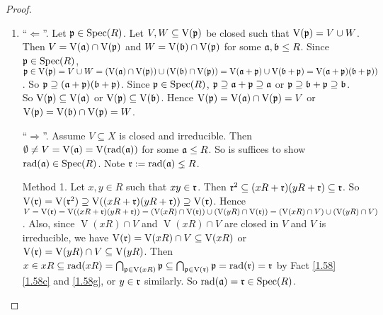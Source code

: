\begin{proof}
    \begin{enumerate}
        \item ``$\Leftarrow$''. Let $\mathfrak{p} \in \operatorname{Spec}(R)$. Let $V,W \subseteq \operatorname{V}(\mathfrak{p})$ be closed such that $\operatorname{V}(\mathfrak{p}) = V \cup W$. Then $V = \operatorname{V}(\mathfrak{a}) \cap \operatorname{V}(\mathfrak{p})$ and $W = \operatorname{V}(\mathfrak{b}) \cap \operatorname{V}(\mathfrak{p})$ for some $\mathfrak{a},\mathfrak{b} \leq R$. Since $\mathfrak{p} \in \operatorname{Spec}(R)$, $\mathfrak{p} \in \operatorname{V}(\mathfrak{p}) = V \cup W = (\operatorname{V}(\mathfrak{a}) \cap \operatorname{V}(\mathfrak{p})) \cup (\operatorname{V}(\mathfrak{b}) \cap \operatorname{V}(\mathfrak{p})) = \operatorname{V}(\mathfrak{a} + \mathfrak{p}) \cup \operatorname{V}(\mathfrak{b} + \mathfrak{p})= \operatorname{V}(\mathfrak{a} + \mathfrak{p})(\mathfrak{b}+\mathfrak{p}))$. So $\mathfrak{p} \supseteq (\mathfrak{a} + \mathfrak{p})(\mathfrak{b} + \mathfrak{p})$. Since $\mathfrak{p} \in \operatorname{Spec}(R)$, $\mathfrak{p} \supseteq \mathfrak{a} + \mathfrak{p} \supseteq \mathfrak{a}$ or $\mathfrak{p} \supseteq \mathfrak{b} + \mathfrak{p} \supseteq \mathfrak{b}$. So $\operatorname{V}(\mathfrak{p}) \subseteq \operatorname{V}(\mathfrak{a})$ or $\operatorname{V}(\mathfrak{p}) \subseteq \operatorname{V}(\mathfrak{b})$. Hence $\operatorname{V}(\mathfrak{p}) = \operatorname{V}(\mathfrak{a}) \cap \operatorname{V}(\mathfrak{p}) = V$ or $\operatorname{V}(\mathfrak{p}) = \operatorname{V}(\mathfrak{b}) \cap \operatorname{V}(\mathfrak{p}) = W$. \par
        ``$\Rightarrow$''. Assume $V \subseteq X$ is closed and irreducible. Then $\emptyset \neq V = \operatorname{V}(\mathfrak{a}) = \operatorname{V}(\operatorname{rad}(\mathfrak{a})) $ for some $\mathfrak{a} \leq R$. So is suffices to show $\operatorname{rad}(\mathfrak{a}) \in \operatorname{Spec}(R)$. Note $\mathfrak{r} := \operatorname{rad}(\mathfrak{a}) \lneq R$. \par 
        Method 1. Let $x,y \in R$ such that $xy \in \mathfrak{r}$. Then $\mathfrak{r}^2 \subseteq (xR+\mathfrak{r})(yR+\mathfrak{r}) \subseteq \mathfrak{r}$. So $\operatorname{V}(\mathfrak{r}) = \operatorname{V}(\mathfrak{r}^2) \supseteq \operatorname{V}((xR+\mathfrak{r})(yR+\mathfrak{r})) \supseteq \operatorname{V}(\mathfrak{r})$. Hence $V = \operatorname{V}(\mathfrak{r}) = \operatorname{V}((xR + \mathfrak{r})(yR+\mathfrak{r})) = (\operatorname{V}(xR) \cap \operatorname{V}(\mathfrak{r})) \cup (\operatorname{V}(yR) \cap \operatorname{V}(\mathfrak{r})) = (\operatorname{V}(xR) \cap V) \cup (\operatorname{V}(yR) \cap V)$. Also, since $\operatorname{V}(xR) \cap V$ and $\operatorname{V}(xR) \cap V$ are closed in $V$ and $V$ is irreducible, we have $\operatorname{V}(\mathfrak{r}) = \operatorname{V}(xR) \cap V \subseteq \operatorname{V}(xR)$ or $\operatorname{V}(\mathfrak{r}) = \operatorname{V}(yR) \cap V \subseteq \operatorname{V}(yR)$. Then $x \in xR \subseteq \operatorname{rad}(xR) = \bigcap_{\mathfrak{p} \in \operatorname{V}(xR)} \mathfrak{p} \subseteq \bigcap_{\mathfrak{p} \in \operatorname{V}(\mathfrak{r})} \mathfrak{p} = \operatorname{rad}(\mathfrak{r}) = \mathfrak{r}$ by Fact \ref{1.58}\ref{1.58c} and \ref{1.58g}, or $y \in \mathfrak{r}$ similarly. So $\operatorname{rad}(\mathfrak{a}) = \mathfrak{r} \in \operatorname{Spec}(R)$. \par 

\end{enumerate}
\end{proof}
